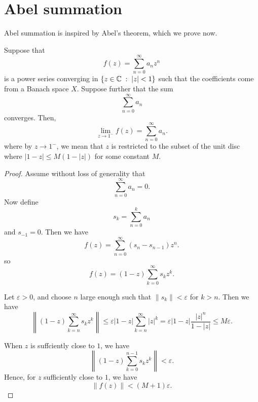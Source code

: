 \section{Abel summation}
Abel summation is inspired by Abel's theorem, which we prove now.
\begin{proposition}
    Suppose that
    \begin{equation*}
        f(z) = \sum_{n=0}^\infty a_n z^n
    \end{equation*}
    is a power series converging in $\{z \in \mathbb{C}\;:\;|z| < 1\}$
    such that the coefficients come from a Banach space $X$. Suppose further that the sum
    \begin{equation*}
        \sum_{n=0}^\infty a_n
    \end{equation*}
    converges. Then,
    \begin{equation*}
        \lim_{z\rightarrow 1^-} f(z) = \sum_{n=0}^\infty a_n.
    \end{equation*}
    where by $z\rightarrow 1^-$, we mean that $z$ is restricted
    to the subset of the unit disc where $|1-z| \leq M(1-|z|)$
    for some constant $M$.
\end{proposition}
\begin{proof}
    Assume without loss of generality that 
    \begin{equation*}
        \sum_{n=0}^\infty a_n = 0.
    \end{equation*}
    Now define
    \begin{equation*}
        s_k = \sum_{n=0}^k a_n
    \end{equation*}
    and $s_{-1} = 0$.
    Then we have
    \begin{equation*}
        f(z) = \sum_{n=0}^\infty (s_n-s_{n-1})z^n.
    \end{equation*}
    so
    \begin{equation*}
        f(z) = (1-z)\sum_{k=0}^\infty s_k z^k.
    \end{equation*}
    
    Let $\varepsilon > 0$, and choose $n$ large enough such that $\|s_k\| < \varepsilon$
    for $k > n$. Then we have
    \begin{equation*}
        \left\|(1-z)\sum_{k=n}^\infty s_k z^k\right\| \leq \varepsilon|1-z|\sum_{k=n}^\infty |z|^k = \varepsilon|1-z| \frac{|z|^n}{1-|z|} \leq M \varepsilon.
    \end{equation*}
    
    When $z$ is suffciently close to $1$, we have
    \begin{equation*}
        \left\|(1-z)\sum_{k=0}^{n-1} s_k z^k\right\| < \varepsilon.
    \end{equation*}
    Hence, for $z$ sufficiently close to $1$, we have
    \begin{equation*}
        \|f(z)\| < (M+1)\varepsilon.
    \end{equation*}
\end{proof}
